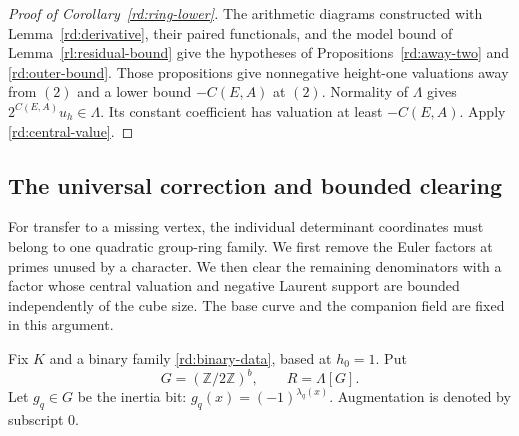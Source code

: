 \begin{proof}[Proof of Corollary~\ref{rd:ring-lower}]
The arithmetic diagrams constructed with Lemma~\ref{rd:derivative},
their paired functionals, and the model bound of
Lemma~\ref{rl:residual-bound} give the hypotheses of
Propositions~\ref{rd:away-two} and \ref{rd:outer-bound}.
Those propositions give nonnegative height-one valuations
away from \((2)\) and a lower bound \(-C(E,A)\) at \((2)\).
Normality of \(\Lambda\) gives \(2^{C(E,A)}u_h\in\Lambda\).
Its constant coefficient has valuation at least \(-C(E,A)\).
Apply \eqref{rd:central-value}.
\end{proof}

\subsection{The universal correction and bounded clearing}
\label{rd:clearing-subsection}

For transfer to a missing vertex, the individual determinant coordinates
must belong to one quadratic group-ring family.  We first remove the
Euler factors at primes unused by a character.  We then clear the
remaining denominators with a factor whose central valuation and
negative Laurent support are bounded independently of the cube size.
The base curve and the companion field are fixed in this argument.

Fix \(K\) and a binary family \eqref{rd:binary-data}, based at
\(h_0=1\).  Put
\[
 G=(\mathbb Z/2\mathbb Z)^b,\qquad R=\Lambda[G].
\]
Let \(g_q\in G\) be the inertia bit:
\(g_q(x)=(-1)^{\lambda_q(x)}\).
Augmentation is denoted by subscript \(0\).

